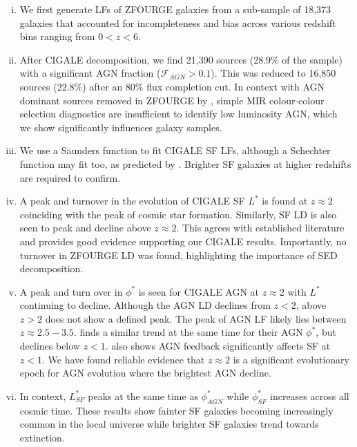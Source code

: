 \begin{enumerate}[(i)]
    \item We first generate LFs of ZFOURGE galaxies from a sub-sample of 18,373 galaxies that accounted for incompleteness and bias across various redshift bins ranging from $0<z<6$.
    
    \item After CIGALE decomposition, we find 21,390 sources (28.9\% of the sample) with a significant AGN fraction ($\mathcal{F}_{AGN} > 0.1$). This was reduced to 16,850 sources (22.8\%) after an 80\% flux completion cut. In context with AGN dominant sources removed in ZFOURGE by \cite{cowley_zfourge_2016}, simple MIR colour-colour selection diagnostics are insufficient to identify low luminosity AGN, which we show significantly influences galaxy samples.
    
    \item We use a Saunders function to fit CIGALE SF LFs, although a Schechter function may fit too, as predicted by \cite{wu_mid-infrared_2011, fu_decomposing_2010}. Brighter SF galaxies at higher redshifts are required to confirm. 

    \item A peak and turnover in the evolution of CIGALE SF $L^{*}$ is found at $z \approx 2$ coinciding with the peak of cosmic star formation. Similarly, SF LD is also seen to peak and decline above $z\approx2$. This agrees with established literature and provides good evidence supporting our CIGALE results. Importantly, no turnover in ZFOURGE LD was found, highlighting the importance of SED decomposition.
    
    \item A peak and turn over in $\phi^{*}$ is seen for CIGALE AGN at $z \approx 2$ with $L^{*}$ continuing to decline. Although the AGN LD declines from $z<2$, above $z>2$ does not show a defined peak. The peak of AGN LF likely lies between $z\approx2.5-3.5$. \cite{delvecchio_tracing_2014} finds a similar trend at the same time for their AGN $\phi^{*}$, but declines below $z<1$. \cite{katsianis_evolution_2017} also shows AGN feedback significantly affects SF at $z<1$. We have found reliable evidence that $z\approx2$ is a significant evolutionary epoch for AGN evolution where the brightest AGN decline. 
    
    \item In context, $L^{*}_{SF}$ peaks at the same time as $\phi^{*}_{AGN}$ while $\phi^{*}_{SF}$ increases across all cosmic time. These results show fainter SF galaxies becoming increasingly common in the local universe while brighter SF galaxies trend towards extinction.  


\end{enumerate}
